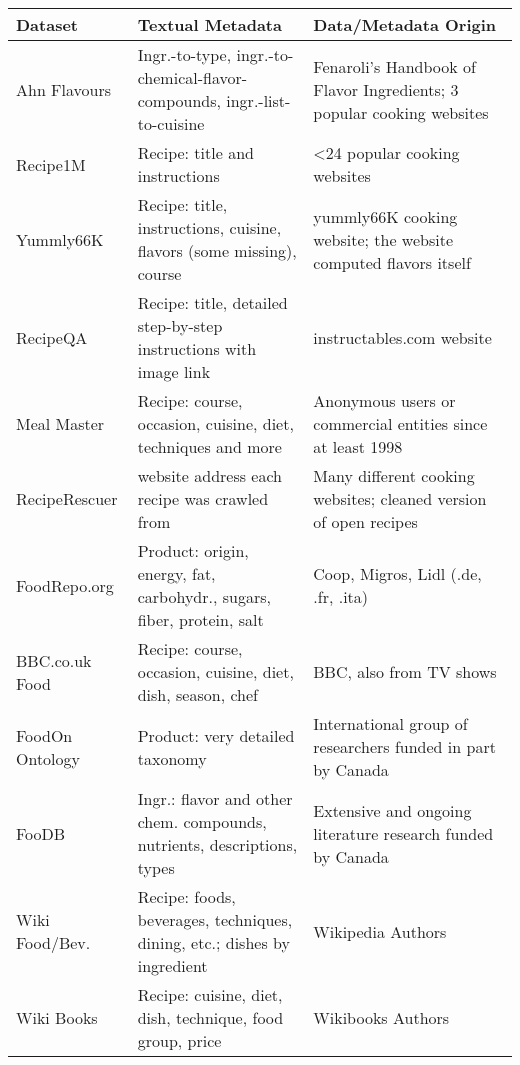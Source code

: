 \begin{tabular}{lll}
\toprule
 Dataset              & Textual Metadata                                                         & Data/Metadata Origin                                                  \\
\midrule
Ahn Flavours          & Ingr.-to-type, ingr.-to-chemical-flavor-compounds, ingr.-list-to-cuisine & Fenaroli's Handbook of Flavor Ingredients; 3 popular cooking websites \\
Recipe1M              & Recipe: title and instructions                                           & <24 popular cooking websites                                          \\
Yummly66K             & Recipe: title, instructions, cuisine, flavors (some missing), course     & yummly66K cooking website; the website computed flavors itself        \\
RecipeQA              & Recipe: title, detailed step-by-step instructions with image link        & instructables.com website                                             \\
Meal Master           & Recipe: course, occasion,  cuisine, diet, techniques and more             & Anonymous users or commercial entities since at least 1998           \\
RecipeRescuer         & website address each recipe was crawled from                             & Many different cooking websites; cleaned version of open recipes      \\
FoodRepo.org          & Product: origin, energy, fat, carbohydr., sugars, fiber, protein, salt   & Coop, Migros, Lidl (.de, .fr, .ita)                                   \\
BBC.co.uk Food        & Recipe: course, occasion, cuisine, diet, dish, season, chef              & BBC, also from TV shows                                               \\
FoodOn Ontology       & Product: very detailed taxonomy                                          & International group of researchers funded in part by Canada           \\
FooDB                 & Ingr.: flavor and other chem. compounds, nutrients, descriptions, types  & Extensive and ongoing literature research funded by Canada            \\
Wiki Food/Bev.        & Recipe: foods, beverages, techniques, dining, etc.; dishes by ingredient & Wikipedia Authors                                                     \\
Wiki Books            & Recipe: cuisine, diet, dish, technique, food group, price                & Wikibooks Authors                                                     \\
\bottomrule
\end{tabular}